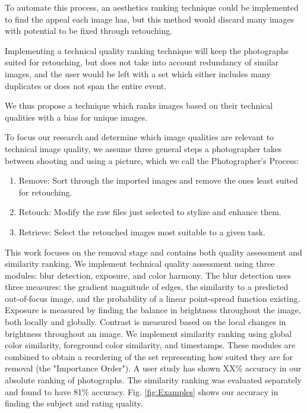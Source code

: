 \documentclass{article}
\begin{document}
To automate this process, an aesthetics ranking technique could be implemented to find the appeal each image has, but this method would discard many images with potential to be fixed through retouching.


Implementing a technical quality ranking technique will keep the photographs suited for retouching, but does not take into account redundancy of similar images, and the user would be left with a set which either includes many duplicates or does not span the entire event.


We thus propose a technique which ranks images based on their technical qualities with a bias for unique images.%

To focus our research and determine which image qualities are relevant to technical image quality, we assume three general steps a photographer takes between shooting and using a picture, which we call the Photographer's Process:
\begin{enumerate}
\item Remove: Sort through the imported images and remove the ones least suited for retouching.
\item Retouch: Modify the raw files just selected to stylize and enhance them.
\item Retrieve: Select the retouched images most suitable to a given task.
\end{enumerate}

This work focuses on the removal stage and contains both quality assessment and similarity ranking. We implement technical quality assessment using three modules: blur detection, exposure, and color harmony. The blur detection uses three measures: the gradient magnitude of edges, the similarity to a predicted out-of-focus image, and the probability of a linear point-spread function existing. Exposure is measured by finding the balance in brightness throughout the image, both locally and globally. Contrast is measured based on the local changes in brightness throughout an image. We implement similarity ranking using global color similarity, foreground color similarity, and timestamps.  These modules are combined to obtain a reordering of the set representing how suited they are for removal (the "Importance Order"). A user study has shown XX\% accuracy in our absolute ranking of photographs. The similarity ranking was evaluated separately and found to have 81\% accuracy. Fig. \ref{fig:Examples} shows our accuracy in finding the subject and rating quality.%
\end{document}
